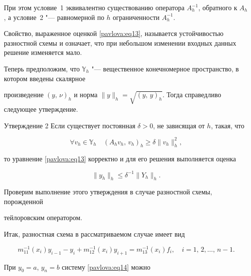 При этом условие~1 эквивалентно существованию оператора $A_h^{-1}$, обратного к $A_h$, а условие~2 "--- равномерной по $h$ ограниченности $A_h^{-1}$. 

Свойство, выраженное оценкой \eqref{pavlova:eq13}, называется устойчивостью разностной схемы и означает, что при небольшом изменении входных данных решение изменяется мало.





Теперь предположим, что $\mathbb{Y}_h$ "--- вещественное конечномерное пространство, в котором введены скалярное

произведение $(y,\,\nu )_h$ и норма $\| y \|_h =\sqrt {(y,\,y)_h} $. Тогда справедливо следующее утверждение.



\smallskip

\begin{newthm}{Утверждение 2} Если существует постоянная $\delta >0$, не зависящая от $h$,  такая, что

\[

\forall v_h \in \mathbb{Y}_h \quad  (A_h v_h,\,v_h)_h \ge \delta \| v_h \|_h^2,

\]

то уравнение \eqref{pavlova:eq13} корректно и для его решения выполняется оценка

\[

\| y_h \|_h \le \delta^{-1}\| Y_h \|_h.

\]

\end{newthm}



\smallskip



Проверим выполнение этого утверждения в случае разностной схемы, порожденной

тейлоровским оператором.

Итак, разностная схема в рассматриваемом случае имеет вид

\begin{equation}

\label{pavlova:eq14} m_{11}^{-1} (x_i)y_{i-1} -y_i +m_{12}^{-1}

(x_i)y_{i+1} =m_{13}^{-1} (x_i)f_i,\quad i=1,\,2,\ldots,\,

n-1.

\end{equation}

При $y_{0}=a$, $y_{n}=b $ систему \eqref{pavlova:eq14} можно

